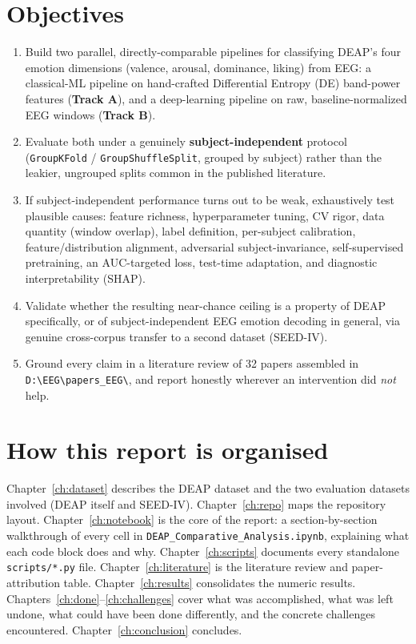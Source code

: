 \documentclass[11pt]{report}
\begin{document}
\section{Objectives}
\begin{enumerate}
  \item Build two parallel, directly-comparable pipelines for classifying
        DEAP's four emotion dimensions (valence, arousal, dominance, liking)
        from EEG: a classical-ML pipeline on hand-crafted Differential
        Entropy (DE) band-power features (\textbf{Track A}), and a
        deep-learning pipeline on raw, baseline-normalized EEG windows
        (\textbf{Track B}).
  \item Evaluate both under a genuinely \textbf{subject-independent}
        protocol (\texttt{GroupKFold} / \texttt{GroupShuffleSplit}, grouped
        by subject) rather than the leakier, ungrouped splits common in the
        published literature.
  \item If subject-independent performance turns out to be weak, exhaustively
        test plausible causes: feature richness, hyperparameter tuning, CV
        rigor, data quantity (window overlap), label definition, per-subject
        calibration, feature/distribution alignment, adversarial
        subject-invariance, self-supervised pretraining, an AUC-targeted
        loss, test-time adaptation, and diagnostic interpretability (SHAP).
  \item Validate whether the resulting near-chance ceiling is a property of
        DEAP specifically, or of subject-independent EEG emotion decoding in
        general, via genuine cross-corpus transfer to a second dataset
        (SEED-IV).
  \item Ground every claim in a literature review of 32 papers assembled in
        \texttt{D:\textbackslash EEG\textbackslash papers\_EEG\textbackslash},
        and report honestly wherever an intervention did \emph{not} help.
\end{enumerate}

\section{How this report is organised}
Chapter~\ref{ch:dataset} describes the DEAP dataset and the two evaluation
datasets involved (DEAP itself and SEED-IV). Chapter~\ref{ch:repo} maps the
repository layout. Chapter~\ref{ch:notebook} is the core of the report: a
section-by-section walkthrough of every cell in
\texttt{DEAP\_Comparative\_Analysis.ipynb}, explaining what each code block
does and why. Chapter~\ref{ch:scripts} documents every standalone
\texttt{scripts/*.py} file. Chapter~\ref{ch:literature} is the literature
review and paper-attribution table. Chapter~\ref{ch:results} consolidates the
numeric results. Chapters~\ref{ch:done}--\ref{ch:challenges} cover what was
accomplished, what was left undone, what could have been done differently,
and the concrete challenges encountered. Chapter~\ref{ch:conclusion}
concludes.
\end{document}
